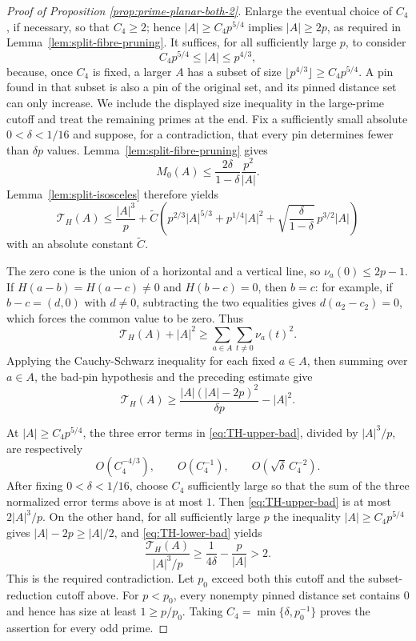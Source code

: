 \documentclass[10pt,a4paper]{amsart}
\begin{document}
\begin{proof}[Proof of Proposition \ref{prop:prime-planar-both-2}]
Enlarge the eventual choice of $C_4$, if necessary, so that
$C_4\ge2$; hence $|A|\ge C_4p^{5/4}$ implies $|A|\ge2p$, as required
in Lemma~\ref{lem:split-fibre-pruning}.  It suffices, for all
sufficiently large $p$, to consider
\[
 C_4p^{5/4}\le |A|\le p^{4/3},
\]
because, once $C_4$ is fixed, a larger $A$ has a subset of size
$\lfloor p^{4/3}\rfloor\ge C_4p^{5/4}$.  A pin found in that subset
is also a pin of the original set, and its pinned distance set can
only increase.  We include the displayed size inequality in the
large-prime cutoff and treat the remaining primes at the end.
Fix a sufficiently small absolute
$0<\delta<1/16$ and suppose, for a contradiction, that every pin
determines fewer than $\delta p$ values.  Lemma~\ref{lem:split-fibre-pruning}
gives
\[
 M_0(A)\le
 \frac{2\delta}{1-\delta}\frac{p^2}{|A|}.
\]
Lemma~\ref{lem:split-isosceles} therefore yields
\begin{equation}
 \label{eq:TH-upper-bad}
 \mathcal T_H(A)
 \le\frac{|A|^3}{p}
 +\widetilde{C}\left(
 p^{2/3}|A|^{5/3}
 +p^{1/4}|A|^2
 +\sqrt{\frac{\delta}{1-\delta}}\,p^{3/2}|A|
 \right)
\end{equation}
with an absolute constant $\widetilde{C}$.

The zero cone is the union of a horizontal and a vertical line, so
$\nu_a(0)\le2p-1$.  If
$H(a-b)=H(a-c)\ne0$ and $H(b-c)=0$, then $b=c$:
for example, if $b-c=(d,0)$ with $d\ne0$, subtracting the two
equalities gives $d(a_2-c_2)=0$, which forces the common value to be
zero.  Thus
\[
 \mathcal T_H(A)+|A|^2
 \ge\sum_{a\in A}\sum_{t\ne0}\nu_a(t)^2.
\]
Applying the Cauchy-Schwarz inequality for each fixed \(a\in A\),
then summing over \(a\in A\), the bad-pin hypothesis and the preceding
estimate give
\begin{equation}
 \label{eq:TH-lower-bad}
 \mathcal T_H(A)
 \ge
 \frac{|A|(|A|-2p)^2}{\delta p}-|A|^2.
\end{equation}

At $|A|\ge C_4p^{5/4}$, the three error terms in \eqref{eq:TH-upper-bad}, divided by $|A|^3/p$, are respectively
\[
 O(C_4^{-4/3}),\qquad
 O(C_4^{-1}),\qquad
 O\!\left(\sqrt{\delta}\,C_4^{-2}\right).
\]
After fixing $0<\delta<1/16$, choose $C_4$ sufficiently large so
that the sum of the three normalized error
terms above is at most $1$.  Then
\eqref{eq:TH-upper-bad} is at most $2|A|^3/p$.  On the other hand, for
all sufficiently large $p$ the inequality
$|A|\ge C_4p^{5/4}$ gives $|A|-2p\ge |A|/2$, and
\eqref{eq:TH-lower-bad} yields
\[
 \frac{\mathcal T_H(A)}{|A|^3/p}
 \ge \frac1{4\delta}-\frac{p}{|A|}>2.
\]
This is the required contradiction. 
Let $p_0$ exceed both this cutoff and the subset-reduction
cutoff above.  For $p<p_0$, every nonempty pinned distance set contains
$0$ and hence has size at least $1\ge p/p_0$. Taking $C_4=\min\{\delta,p_0^{-1}\}$ proves the assertion for every odd prime.
\end{proof}
\end{document}
